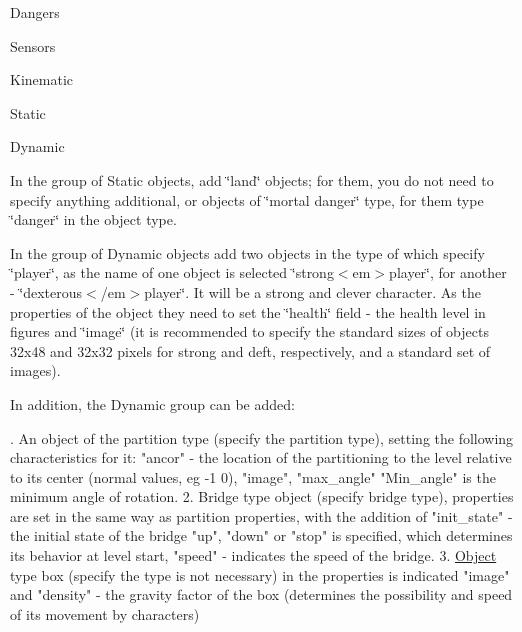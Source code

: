 \begin{DoxyItemize}
\item Dangers


\item Sensors


\item Kinematic


\item Static


\item Dynamic 
\end{DoxyItemize}

In the group of Static objects, add \char`\"{}land\char`\"{} objects; for them, you do not need to specify anything additional, or objects of \char`\"{}mortal danger\char`\"{} type, for them type \char`\"{}danger\char`\"{} in the object type.

In the group of Dynamic objects add two objects in the type of which specify \char`\"{}player\char`\"{}, as the name of one object is selected \char`\"{}strong$<$em$>$player\char`\"{}, for another -\/ \char`\"{}dexterous$<$/em$>$player\char`\"{}. It will be a strong and clever character. As the properties of the object they need to set the \char`\"{}health\char`\"{} field -\/ the health level in figures and \char`\"{}image\char`\"{} (it is recommended to specify the standard sizes of objects 32x48 and 32x32 pixels for strong and deft, respectively, and a standard set of images).


\begin{DoxyPre}{\ttfamily In addition, the Dynamic group can be added:}\end{DoxyPre}



\begin{DoxyPre}{. An object of the partition type (specify the partition type), setting the following characteristics for it: "ancor" - the location of the partitioning to the level relative to its center (normal values, eg -1 0), "image", "max\_angle" "Min\_angle" is the minimum angle of rotation.
    2. Bridge type object (specify bridge type), properties are set in the same way as partition properties, with the addition of "init\_state" - the initial state of the bridge "up", "down" or "stop" is specified, which determines its behavior at level start, "speed" - indicates the speed of the bridge.
    3. \hyperlink{class_object}{Object} type box (specify the type is not necessary) in the properties is indicated "image" and "density" - the gravity factor of the box (determines the possibility and speed of its movement by characters)
}\end{DoxyPre}


